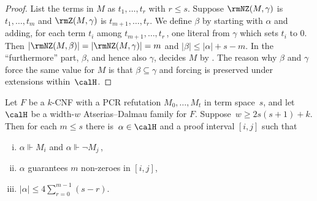 \begin{proof}
List the terms in $M$ as $t_1, \dots, t_r$ with $r \le s$.
Suppose $\rmNZ(M, \gamma)$ is $t_1, \dots, t_m$ and 
$\rmZ(M, \gamma)$ is $t_{m+1}, \dots, t_r$.
We define $\beta$ by starting with $\alpha$ and adding, for 
each term $t_i$ among $t_{m+1}, \dots, t_r$\,, one literal from $\gamma$ which sets $t_i$ to $0$.
Then  $|\rmNZ(M, \beta)|=|\rmNZ(M, \gamma)| = m$ and $|\beta| \le |\alpha|+s-m$.
In the ``furthermore'' part, $\beta$, and hence also $\gamma$,
decides $M$ by  . 
The reason why $\beta$ and $\gamma$ force the same value for $M$ 
is that \mbox{$\beta \subseteq \gamma$} and
forcing is preserved under extensions within~$\calH$.
\end{proof}


\begin{lemma}\label{lem:main} 
Let $F$ be a $k$-CNF with a PCR refutation
$M_0, \ldots, M_t$ in term space~$s$, 
and let $\calH$ be a width-$w$ Atserias--Dalmau family for $F$.
Suppose~$w \ge 2s(s+1)+k$.
Then for each $m \le s$ there is~$\alpha \in \calH$ 
and a proof interval $[i,j]$ such that
\begin{enumerate}[(i)]
\item 
$\alpha \Vdash M_{i}$ and  $\alpha \Vdash \neg M_{j}$\,,
\item 
$\alpha$ guarantees $m$ non-zeroes in $[i,j]$,
\item 
$|\alpha| \le \displaystyle {4\sum_{r=0}^{m-1} (s - r)}$.
\end{enumerate}
\end{lemma}

